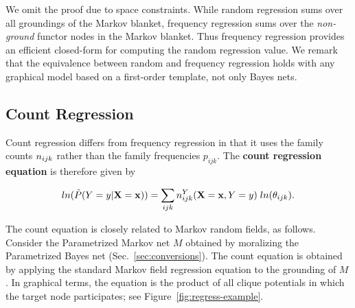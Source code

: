 \documentclass[twoside,leqno,twocolumn]{article}
\begin{document}



We omit the proof due to space constraints. While random regression sums over all groundings of the Markov blanket, frequency regression sums over the {\em non-ground} functor nodes in the Markov blanket. Thus frequency regression provides an efficient closed-form for computing the random regression value.
We remark that the equivalence between random and frequency regression holds with any graphical model based on a first-order template, not only Bayes nets. 


\subsection{Count Regression} \label{sec:count}
Count regression differs from frequency regression in that it uses the family counts $n_{ijk}$ rather than the family frequencies $p_{ijk}$. The \textbf{count regression equation} is therefore given by 

\begin{equation} \label{eq:regress-count}
ln(\tilde{P}(Y = y|\mathbf{X}=\mathbf{x})) = \sum_{ijk} n^{Y}_{ijk}(\mathbf{X}=\mathbf{x},Y = y) \; ln(\theta_{ijk}).\end{equation}

The count equation is closely related to Markov random fields, as follows. Consider the Parametrized Markov net $M$ obtained by moralizing the Parametrized Bayes net (Sec.~\ref{sec:conversions}). The count equation is obtained by applying the standard Markov field regression equation to the grounding of $M$ \cite{Domingos2009}. In graphical terms, the equation is the product of all clique potentials in which the target node participates; see Figure~\ref{fig:regress-example}. 
\end{document}
